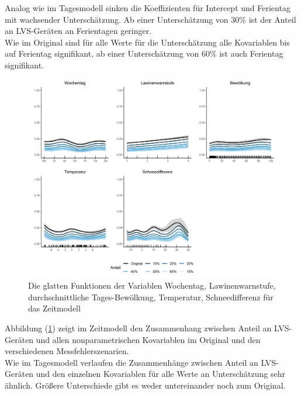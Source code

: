 \documentclass[12pt]{scrreprt}
\begin{document}
\noindent Analog wie im Tagesmodell sinken die Koeffizienten für Intercept und Ferientag mit wachsender Unterschätzung. Ab einer Unterschätzung von 30\% ist der Anteil an LVS-Geräten an Ferientagen geringer. \\
Wie im Original sind für alle Werte für die Unterschätzung alle Kovariablen bis auf Ferientag signifikant, ab einer Unterschätzung von 60\% ist auch Ferientag signifikant. \\
\begin{figure}[H]
	\centering
	\includegraphics[width=\linewidth]{plots/time_model_general_comparison}
	\caption{ Die glatten Funktionen der Variablen Wochentag, Lawinenwarnstufe, durchschnittliche Tages-Bewölkung, Temperatur, Schneedifferenz für das Zeitmodell}
	\label{pic:time_model_general_comparison}	
\end{figure}
\noindent Abbildung (\ref{pic:time_model_general_comparison}) zeigt im Zeitmodell den Zusammenhang zwischen Anteil an LVS-Geräten und allen nonparametrischen Kovariablen im Original und den verschiedenen Messfehlerszenarien. \\
Wie im Tagesmodell verlaufen die Zusammenhänge zwischen Anteil an LVS-Geräten und den einzelnen Kovariablen für alle Werte an Unterschätzung sehr ähnlich. Größere Unterschiede gibt es weder untereinander noch zum Original.
\end{document}
